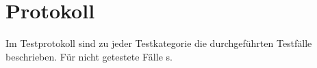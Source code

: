 %



\newpage



\section{Protokoll}
\label{Abschnitt:Tests:Protokoll}

Im Testprotokoll sind zu jeder Testkategorie die durchgeführten Testfälle beschrieben. Für nicht getestete Fälle s. %










